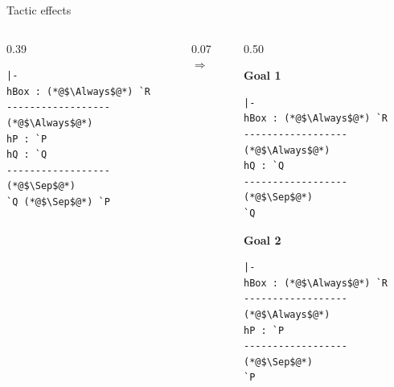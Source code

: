 \documentclass[10pt,aspectratio=169]{beamer}
\begin{document}
\begin{frame}[fragile]{Tactic effects}
  \begin{columns}[c,onlytextwidth]
    \begin{column}{0.39\textwidth}
\begin{lstlisting}[style=leancode]
|-
hBox : (*@$\Always$@*) `R
------------------ (*@$\Always$@*)
hP : `P
hQ : `Q
------------------ (*@$\Sep$@*)
`Q (*@$\Sep$@*) `P
\end{lstlisting}
    \end{column}
    \begin{column}{0.07\textwidth}
      \centering\Large$\Longrightarrow$
    \end{column}
    \begin{column}{0.50\textwidth}
      \par\vspace{0.08cm}
      {\small\bfseries Goal 1\par}
\begin{lstlisting}[style=leancode]
|-
hBox : (*@$\Always$@*) `R
------------------ (*@$\Always$@*)
hQ : `Q
------------------ (*@$\Sep$@*)
`Q
\end{lstlisting}
      {\small\bfseries Goal 2\par}
\begin{lstlisting}[style=leancode]
|-
hBox : (*@$\Always$@*) `R
------------------ (*@$\Always$@*)
hP : `P
------------------ (*@$\Sep$@*)
`P
\end{lstlisting}
    \end{column}
  \end{columns}
\end{frame}
\end{document}
